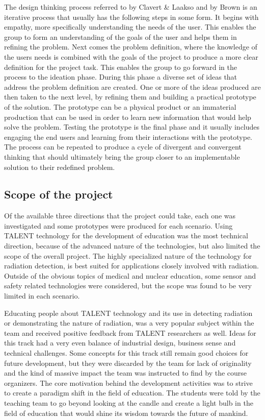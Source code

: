 \documentclass[english,12pt,a4paper,dvips]{article}
\begin{document}
The design thinking process referred to by Clavert & Laakso \cite{Clavert} and by Brown \cite{Brown} is an iterative process that usually has the following steps in some form. It begins with empathy, more specifically understanding the needs of the user. This enables the group to form an understanding of the goals of the user and helps them in refining the problem. Next comes the problem definition, where the knowledge of the users needs is combined with the goals of the project to produce a more clear definition for the project task. This enables the group to go forward in the process to the ideation phase. During this phase a diverse set of ideas that address the problem definition are created. One or more of the ideas produced are then taken to the next level, by refining them and building a practical prototype of the solution. The prototype can be a physical product or an immaterial production that can be used in order to learn new information that would help solve the problem. Testing the prototype is the final phase and it usually includes engaging the end users and learning from their interactions with the prototype. \cite{Clavert} \cite{Brown} The process can be repeated to produce a cycle of divergent and convergent thinking that should ultimately bring the group closer to an implementable solution to their redefined problem.

\subsection{Scope of the project}

Of the available three directions that the project could take, each one was investigated and some prototypes were produced for each scenario. Using TALENT technology for the development of education was the most technical direction, because of the advanced nature of the technologies, but also limited the scope of the overall project. The highly specialized nature of the technology for radiation detection, is best suited for applications closely involved with radiation. Outside of the obvious topics of medical and nuclear education, some sensor and safety related technologies were considered, but the scope was found to be very limited in each scenario.

Educating people about TALENT technology and its use in detecting radiation or demonstrating the nature of radiation, was a very popular subject within the team and received positive feedback from TALENT researchers as well. Ideas for this track had a very even balance of industrial design, business sense and technical challenges. Some concepts for this track still remain good choices for future development, but they were discarded by the team for lack of originality and the kind of massive impact the team was instructed to find by the course organizers. The core motivation behind the development activities was to strive to create a paradigm shift in the field of education. The students were told by the teaching team to go beyond looking at the candle and create a light bulb in the field of education that would shine its wisdom towards the future of mankind.
\end{document}
